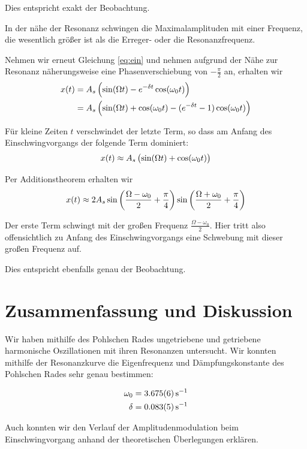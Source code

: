 \documentclass[a4paper,german,12pt,smallheadings]{scrartcl}
\begin{document}
Dies entspricht exakt der Beobachtung.

In der nähe der Resonanz schwingen die Maximalamplituden mit einer Frequenz,
die wesentlich größer ist als die Erreger- oder die Resonanzfrequenz.

Nehmen wir erneut Gleichung \ref{eq:ein} und nehmen aufgrund der Nähe zur
Resonanz näherungsweise eine Phasenverschiebung von $-\frac{\pi}{2}$ an,
erhalten wir
\begin{align}
  x(t) &= A_s \del{\sin(\Omega t) - e^{-\delta t} \cos(\omega_0 t)} \\
       &= A_s \del{\sin(\Omega t) + \cos(\omega_0 t) - (e^{-\delta t} - 1) \cos(\omega_0 t)}
\end{align}

Für kleine Zeiten $t$ verschwindet der letzte Term, so dass am Anfang des
Einschwingvorgangs der folgende Term dominiert:
\begin{equation}
  x(t) \approx A_s \del{\sin(\Omega t) + \cos(\omega_0 t)}
\end{equation}

Per Additionstheorem erhalten wir
\begin{equation}
  x(t) \approx 2 A_s \sin\del{\frac{\Omega - \omega_0}{2} + \frac{\pi}{4}}
  \sin\del{\frac{\Omega + \omega_0}{2} + \frac{\pi}{4}}
\end{equation}

Der erste Term schwingt mit der großen Frequenz $\frac{\Omega - \omega_0}{2}$.
Hier tritt also offensichtlich zu Anfang des Einschwingvorgangs eine Schwebung
mit dieser großen Frequenz auf.

Dies entspricht ebenfalls genau der Beobachtung.

\section{Zusammenfassung und Diskussion}
Wir haben mithilfe des Pohlschen Rades ungetriebene und getriebene harmonische
Oszillationen mit ihren Resonanzen untersucht. Wir konnten mithilfe der
Resonanzkurve die Eigenfrequenz und Dämpfungskonstante des Pohlschen Rades sehr
genau bestimmen:

\begin{align}
  \omega_0 &= \SI{3,675+-0.006}{s^{-1}} \\
  \delta &= \SI{0.083+-0.005}{s^{-1}}
\end{align}

Auch konnten wir den Verlauf der Amplitudenmodulation beim Einschwingvorgang
anhand der theoretischen Überlegungen erklären.
\end{document}
